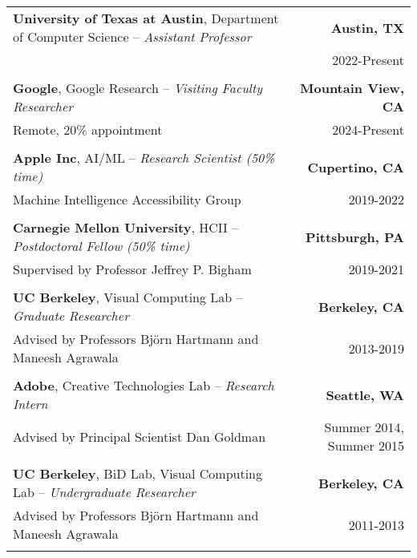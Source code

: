 \begin{longtable}{Xr}
	\textbf{University of Texas at Austin}, Department of Computer Science -- \textit{Assistant Professor} & \textbf{Austin, TX} \\
	 & 2022-Present \\
	\\

	\textbf{Google}, Google Research -- \textit{Visiting Faculty Researcher} & \textbf{Mountain View, CA} \\
	Remote, 20\% appointment & 2024-Present \\
	\\

	\textbf{Apple Inc}, AI/ML -- \textit{Research Scientist (50\% time)} & \textbf{Cupertino, CA} \\
	Machine Intelligence Accessibility Group & 2019-2022 \\
	\\

	\textbf{Carnegie Mellon University}, HCII -- \textit{Postdoctoral Fellow (50\% time)} & \textbf{Pittsburgh, PA} \\
	Supervised by Professor Jeffrey P. Bigham & 2019-2021 \\
	\\

	\textbf{UC Berkeley}, Visual Computing Lab -- \textit{Graduate Researcher} & \textbf{Berkeley, CA} \\
	Advised by Professors Björn Hartmann and Maneesh Agrawala & 2013-2019 \\
	\\

	\textbf{Adobe}, Creative Technologies Lab -- \textit{Research Intern} & \textbf{Seattle, WA} \\
	Advised by Principal Scientist Dan Goldman & Summer 2014, Summer 2015 \\
	\\

	\textbf{UC Berkeley}, BiD Lab, Visual Computing Lab -- \textit{Undergraduate Researcher} & \textbf{Berkeley, CA} \\
	Advised by Professors Björn Hartmann and Maneesh Agrawala & 2011-2013 \\
	\\

\end{longtable}